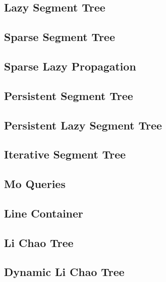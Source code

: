 \subsection{Lazy Segment Tree}
\raggedbottom
\hrulefill
\subsection{Sparse Segment Tree}
\raggedbottom
\hrulefill
\subsection{Sparse Lazy Propagation}
\raggedbottom
\hrulefill
\subsection{Persistent Segment Tree}
\raggedbottom
\hrulefill
\subsection{Persistent Lazy Segment Tree}
\raggedbottom
\hrulefill
\subsection{Iterative Segment Tree}
\raggedbottom
\hrulefill
\subsection{Mo Queries}
\raggedbottom
\hrulefill
\subsection{Line Container}
\raggedbottom
\hrulefill
\subsection{Li Chao Tree}
\raggedbottom
\hrulefill
\subsection{Dynamic Li Chao Tree}
\raggedbottom
\hrulefill
\newpage

